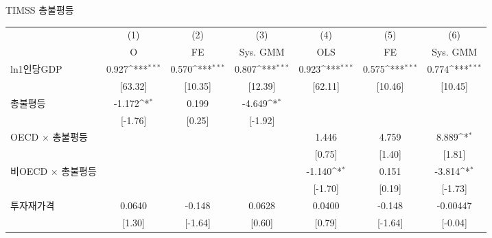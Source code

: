 \centering
\def\sym#1{\ifmmode^{#1}\else\(^{#1}\)\fi}
\caption{TIMSS 총불평등\label{tab:timsssimp}}
\begin{tabular}{l*{6}{c}}
\toprule
                    &\multicolumn{1}{c}{(1)}&\multicolumn{1}{c}{(2)}&\multicolumn{1}{c}{(3)}&\multicolumn{1}{c}{(4)}&\multicolumn{1}{c}{(5)}&\multicolumn{1}{c}{(6)}\\
                    &\multicolumn{1}{c}{O}&\multicolumn{1}{c}{FE}&\multicolumn{1}{c}{Sys. GMM}&\multicolumn{1}{c}{OLS}&\multicolumn{1}{c}{FE}&\multicolumn{1}{c}{Sys. GMM}\\
\midrule
ln1인당GDP        &       0.927\sym{***}&       0.570\sym{***}&       0.807\sym{***}&       0.923\sym{***}&       0.575\sym{***}&       0.774\sym{***}\\
                    &     [63.32]         &     [10.35]         &     [12.39]         &     [62.11]         &     [10.46]         &     [10.45]         \\
\addlinespace
총불평등          &      -1.172\sym{*}  &       0.199         &      -4.649\sym{*}  &                     &                     &                     \\
                    &     [-1.76]         &      [0.25]         &     [-1.92]         &                     &                     &                     \\
\addlinespace
OECD $\times$ 총불평등&                     &                     &                     &       1.446         &       4.759         &       8.889\sym{*}  \\
                    &                     &                     &                     &      [0.75]         &      [1.40]         &      [1.81]         \\
\addlinespace
비OECD $\times$ 총불평등&                     &                     &                     &      -1.140\sym{*}  &       0.151         &      -3.814\sym{*}  \\
                    &                     &                     &                     &     [-1.70]         &      [0.19]         &     [-1.73]         \\
\addlinespace
투자재가격        &      0.0640         &      -0.148         &      0.0628         &      0.0400         &      -0.148         &    -0.00447         \\
                    &      [1.30]         &     [-1.64]         &      [0.60]         &      [0.79]         &     [-1.64]         &     [-0.04]         \\

\end{tabular}
